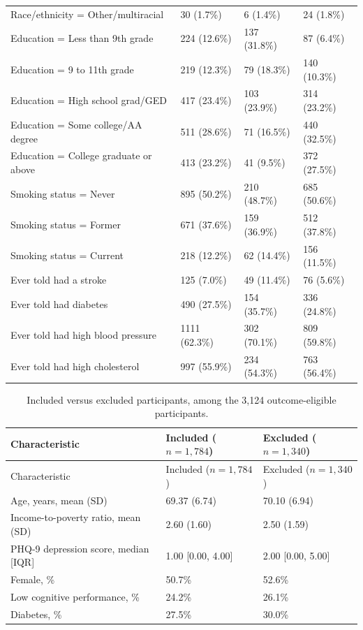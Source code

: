 \documentclass[12pt]{article}
\begin{document}
\begin{singlespace}
\begin{longtable}{L{4.6cm}R{3.35cm}R{3.35cm}R{3.35cm}}
Race/ethnicity = Other/multiracial & 30 (1.7\%) & 6 (1.4\%) & 24 (1.8\%) \\
Education = Less than 9th grade & 224 (12.6\%) & 137 (31.8\%) & 87 (6.4\%) \\
Education = 9 to 11th grade & 219 (12.3\%) & 79 (18.3\%) & 140 (10.3\%) \\
Education = High school grad/GED & 417 (23.4\%) & 103 (23.9\%) & 314 (23.2\%) \\
Education = Some college/AA degree & 511 (28.6\%) & 71 (16.5\%) & 440 (32.5\%) \\
Education = College graduate or above & 413 (23.2\%) & 41 (9.5\%) & 372 (27.5\%) \\
Smoking status = Never & 895 (50.2\%) & 210 (48.7\%) & 685 (50.6\%) \\
Smoking status = Former & 671 (37.6\%) & 159 (36.9\%) & 512 (37.8\%) \\
Smoking status = Current & 218 (12.2\%) & 62 (14.4\%) & 156 (11.5\%) \\
Ever told had a stroke & 125 (7.0\%) & 49 (11.4\%) & 76 (5.6\%) \\
Ever told had diabetes & 490 (27.5\%) & 154 (35.7\%) & 336 (24.8\%) \\
Ever told had high blood pressure & 1111 (62.3\%) & 302 (70.1\%) & 809 (59.8\%) \\
Ever told had high cholesterol & 997 (55.9\%) & 234 (54.3\%) & 763 (56.4\%) \\
\end{longtable}

\bigskip

\begin{longtable}{p{6.0cm}R{3.5cm}R{3.5cm}}
\caption{Included versus excluded participants, among the 3,124 outcome-eligible participants.}
\label{tab:t1b}\\
\toprule
Characteristic & Included ($n=1{,}784$) & Excluded ($n=1{,}340$) \\
\midrule
\endfirsthead
\toprule
Characteristic & Included ($n=1{,}784$) & Excluded ($n=1{,}340$) \\
\midrule
\endhead
\bottomrule
\endlastfoot
Age, years, mean (SD) & 69.37 (6.74) & 70.10 (6.94) \\
Income-to-poverty ratio, mean (SD) & 2.60 (1.60) & 2.50 (1.59) \\
PHQ-9 depression score, median [IQR] & 1.00 [0.00, 4.00] & 2.00 [0.00, 5.00] \\
Female, \% & 50.7\% & 52.6\% \\
Low cognitive performance, \% & 24.2\% & 26.1\% \\
Diabetes, \% & 27.5\% & 30.0\% \\
\end{longtable}


\end{singlespace}
\end{document}
